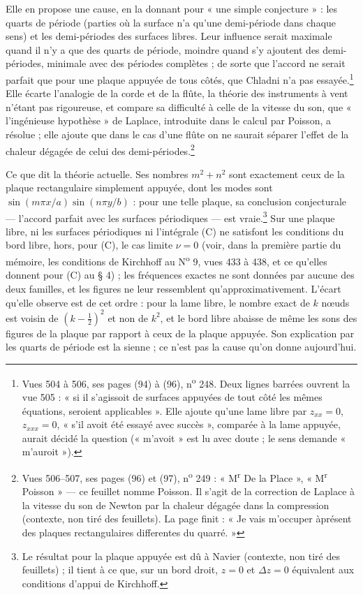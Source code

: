 \documentclass[11pt,a4paper]{article}
\begin{document}
Elle en propose une cause, en la donnant pour « une simple conjecture » : les
quarts de période (parties où la surface n'a qu'une demi-période dans chaque
sens) et les demi-périodes des surfaces libres. Leur influence serait maximale
quand il n'y a que des quarts de période, moindre quand s'y ajoutent des
demi-périodes, minimale avec des périodes complètes ; de sorte que l'accord ne
serait parfait que pour une plaque appuyée de tous côtés, que Chladni n'a pas
essayée.\footnote{Vues 504 à 506, ses pages (94) à (96), n\textsuperscript{o}
248. Deux lignes barrées ouvrent la vue 505 : « si il s'agissoit de surfaces
appuyées de tout côté les mêmes équations, seroient applicables ». Elle ajoute
qu'une lame libre par $z_{xx}=0$, $z_{xxx}=0$, « s'il avoit été essayé avec
succès », comparée à la lame appuyée, aurait décidé la question (« m'avoit »
est lu avec doute ; le sens demande « m'auroit »).} Elle écarte l'analogie de
la corde et de la flûte, la théorie des instruments à vent n'étant pas
rigoureuse, et compare sa difficulté à celle de la vitesse du son, que
« l'ingénieuse hypothèse » de Laplace, introduite dans le calcul par Poisson, a
résolue ; elle ajoute que dans le cas d'une flûte on ne saurait séparer
l'effet de la chaleur dégagée de celui des demi-périodes.\footnote{Vues 506--507,
ses pages (96) et (97), n\textsuperscript{o} 249 : « M\textsuperscript{r} De la
Place », « M\textsuperscript{r} Poisson » — ce feuillet nomme Poisson. Il
s'agit de la correction de Laplace à la vitesse du son de Newton par la chaleur
dégagée dans la compression (contexte, non tiré des feuillets). La page finit :
« Je vais m'occuper àprésent des plaques rectangulaires differentes du
quarré. »}

Ce que dit la théorie actuelle. Ses nombres $m^2+n^2$ sont exactement ceux de
la plaque rectangulaire simplement appuyée, dont les modes sont
$\sin(m\pi x/a)\sin(n\pi y/b)$ : pour une telle plaque, sa conclusion
conjecturale — l'accord parfait avec les surfaces périodiques — est
vraie.\footnote{Le résultat pour la plaque appuyée est dû à Navier (contexte,
non tiré des feuillets) ; il tient à ce que, sur un bord droit, $z = 0$ et
$\Delta z = 0$ équivalent aux conditions d'appui de Kirchhoff.} Sur une plaque
libre, ni les surfaces périodiques ni l'intégrale (C) ne satisfont les conditions
du bord libre, hors, pour (C), le cas limite $\nu = 0$ (voir, dans la première
partie du mémoire, les conditions de Kirchhoff au N\textsuperscript{o} 9, vues
433 à 438, et ce qu'elles donnent pour (C) au § 4) ; les fréquences exactes ne sont données par aucune des deux
familles, et les figures ne leur ressemblent qu'approximativement. L'écart
qu'elle observe est de cet ordre : pour la lame libre, le nombre exact de $k$
nœuds est voisin de $(k-\frac12)^2$ et non de $k^2$, et le bord libre abaisse de
même les sons des figures de la plaque par rapport à ceux de la plaque appuyée.
Son explication par les quarts de période est la sienne ; ce n'est pas la cause
qu'on donne aujourd'hui.
\end{document}
